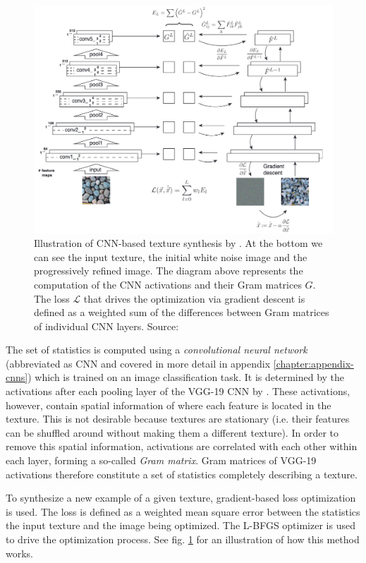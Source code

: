 \begin{figure}[ht]
    \centering
    \includegraphics[width=\textwidth]{images/02-gatys_method_compressed.jpg}
    \caption{Illustration of CNN-based texture synthesis by \citet{Gatys2015}. At the bottom we can see the input texture, the initial white noise image and the progressively refined image. The diagram above represents the computation of the CNN activations and their Gram matrices \(G\). The loss \(\mathcal{L}\) that drives the optimization via gradient descent is defined as a weighted sum of the differences between Gram matrices of individual CNN layers. Source: \citet{Gatys2015}}
    \label{fig:background_gatys_method}
\end{figure}

The set of statistics is computed using a \textit{convolutional neural network} (abbreviated as CNN and covered in more detail in appendix \ref{chapter:appendix-cnns}) which is trained on an image classification task. It is determined by the activations after each pooling layer of the VGG-19 CNN by \citet{Simonyan2014}. These activations, however, contain spatial information of where each feature is located in the texture. This is not desirable because textures are stationary (i.e. their features can be shuffled around without making them a different texture). In order to remove this spatial information, activations are correlated with each other within each layer, forming a so-called \textit{Gram matrix}. Gram matrices of VGG-19 activations therefore constitute a set of statistics completely describing a texture.

To synthesize a new example of a given texture, gradient-based loss optimization is used. The loss is defined as a weighted mean square error between the statistics the input texture and the image being optimized. The L-BFGS optimizer is used to drive the optimization process. See fig. \ref{fig:background_gatys_method} for an illustration of how this method works.


